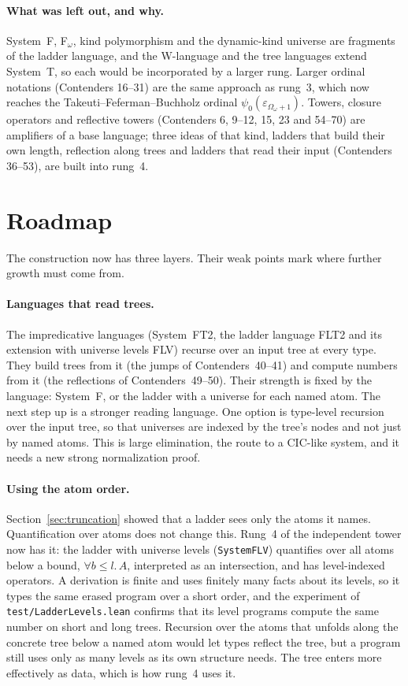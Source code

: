 \documentclass[11pt]{article}
\theoremstyle{definition}
\theoremstyle{remark}
\newcommand{\lean}[1]{\texttt{#1}}
\begin{document}
\paragraph{What was left out, and why.} System~F, F$_\omega$, kind
polymorphism and the dynamic-kind universe are fragments of the ladder
language, and the W-language and the tree languages extend System~T, so each
would be incorporated by a larger rung. Larger ordinal notations (Contenders
16--31) are the same approach as rung~3, which now reaches the
Takeuti--Feferman--Buchholz ordinal $\psi_0(\varepsilon_{\Omega_\omega+1})$. Towers, closure operators and reflective
towers (Contenders 6, 9--12, 15, 23 and 54--70) are amplifiers of a base
language; three ideas of that kind, ladders that build their own length,
reflection along trees and ladders that read their input (Contenders 36--53),
are built into rung~4.

\section{Roadmap}

The construction now has three layers. Their weak points mark where further
growth must come from.

\paragraph{Languages that read trees.} The impredicative languages (System~FT2,
the ladder language FLT2 and its extension with universe levels FLV) recurse
over an input tree at every type. They
build trees from it (the jumps of Contenders~40--41) and compute numbers from
it (the reflections of Contenders~49--50). Their strength is fixed by the
language: System~F, or the ladder with a universe for each named atom. The
next step up is a stronger reading language. One option is type-level
recursion over the input tree, so that universes are indexed by the tree's
nodes and not just by named atoms. This is large elimination, the route to a
CIC-like system, and it needs a new strong normalization proof.

\paragraph{Using the atom order.} Section~\ref{sec:truncation} showed that a
ladder sees only the atoms it names. Quantification over atoms does not change
this. Rung~4 of the independent tower now has it: the ladder with universe
levels (\lean{SystemFLV}) quantifies over all atoms below a bound,
$\forall b\le l.\,A$, interpreted as an intersection, and has level-indexed
operators. A derivation is finite and uses finitely many facts about its
levels, so it types the same erased program over a short order, and the
experiment of \lean{test/LadderLevels.lean} confirms that its level programs
compute the same number on short and long trees. Recursion over the atoms that
unfolds along the concrete tree below a named atom would let types reflect the
tree, but a program still uses only as many levels as its own structure needs.
The tree enters more effectively as data, which is how rung~4 uses it.
\end{document}
